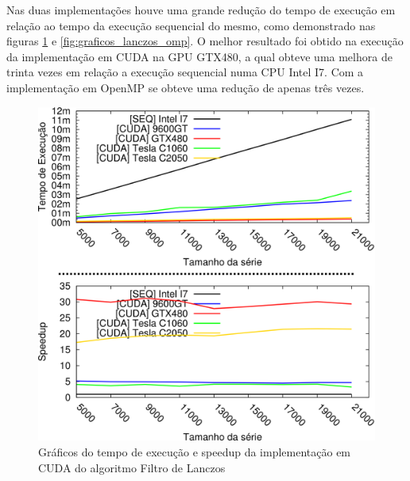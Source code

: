 Nas duas implementações houve uma grande redução do tempo de execução em relação ao tempo da execução sequencial do mesmo, como demonstrado nas figuras \ref{fig:graficos_lanczos_cuda} e \ref{fig:graficos_lanczos_omp}. O melhor resultado foi obtido na execução da implementação em CUDA na GPU GTX480, a qual obteve uma melhora de trinta vezes em relação a execução sequencial numa CPU Intel I7. Com a implementação em OpenMP se obteve uma redução de apenas três vezes.

\begin{figure}[H]
\centering
\includegraphics[]{Imagens/graficos_lanczos/lanczos_cuda.png}
\caption{Gráficos do tempo de execução e speedup da implementação em CUDA do algoritmo Filtro de Lanczos}
\label{fig:graficos_lanczos_cuda}
\end{figure}

